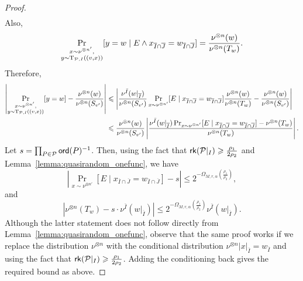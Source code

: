 \documentclass[11pt]{article}
\newcommand\card[1]{\left| {#1} \right|}
\renewcommand\geq{\geqslant}
\renewcommand\leq{\leqslant}
\begin{document}
\begin{proof}
\begin{align*}
\end{align*}
Also, 
\begin{align*}
    \Pr_{\substack{x\sim \nu^{\otimes n'},\\ y\sim {\rm T}_{\mathcal{P},I} ((v, x))}}[y=w \mid E \wedge x_{\overline{I}\cap \overline{J}} = w_{\overline{I}\cap \overline{J}}] = \frac{\nu^{\otimes n}(w)}{\nu^{\otimes n}(T_w)}.
\end{align*}
Therefore,
\begin{align*}
    \card{\Pr_{\substack{x\sim \nu^{\otimes n'},\\ y\sim {\rm T}_{\mathcal{P},I} ((v, x))}}[y=w]  - \frac{\nu^{\otimes n}(w)}{\nu^{\otimes n}(S_{v'})}} &\leq \card{ \frac{\nu^{\bar{I}}(w|_{\overline{I}})}{\nu^{\otimes n}(S_{v'})}\Pr_{x\sim \nu^{\otimes n'}}[ E \mid x_{\overline{I}\cap \overline{J}} = w_{\overline{I}\cap \overline{J}}] \frac{\nu^{\otimes n}(w)}{\nu^{\otimes n}(T_w)}   -\frac{\nu^{\otimes n}(w)}{\nu^{\otimes n}(S_{v'})}}\\
    &\leq \frac{\nu^{\otimes n}(w)}{\nu^{\otimes n}(S_{v'})}\card{ \frac{\nu^{\bar{I}}(w|_{\overline{I}})\Pr_{x\sim \nu^{\otimes n'}}[ E \mid x_{\overline{I}\cap \overline{J}} = w_{\overline{I}\cap \overline{J}}] - \nu^{\otimes n}(T_w)}{\nu^{\otimes n}(T_w)}}.
\end{align*}
Let $s= \prod_{P\in \mathcal{P}} {\sf ord}(P)^{-1}$. Then, using the fact that  ${\sf rk}(\mathcal{P}|_{{I}})\geq \frac{\rho_1}{2\rho_2}$ and Lemma~\ref{lemma:quasirandom_onefunc}, we have
$$ \card{\Pr_{x\sim \nu^{\otimes n'}}[ E \mid x_{\overline{I}\cap \overline{J}} = w_{\overline{I}\cap \overline{J}}] - s} \leq 2^{-\Omega_{M,r,\alpha}\left(\frac{\rho_1}{\rho_2}\right)},$$
and
$$\card{\nu^{\otimes n}(T_w) - s\cdot \nu^{\bar{I}}(w|_{\overline{I}})} \leq 2^{-\Omega_{M,r,\alpha}\left(\frac{\rho_1}{\rho_2}\right)}\nu^{\bar{I}}(w|_{\overline{I}}).$$
Although the latter statement does not follow directly from Lemma~\ref{lemma:quasirandom_onefunc}, observe that the same proof works if we replace the distribution $\nu^{\otimes n}$ with the conditional distribution $\nu^{\otimes n}|x|_{\overline{I}}= w_{\overline{I}}$ and using the fact that  ${\sf rk}(\mathcal{P}|_{{I}})\geq \frac{\rho_1}{2\rho_2}$. Adding the conditioning back gives the required bound as above.


\end{proof}
\end{document}
